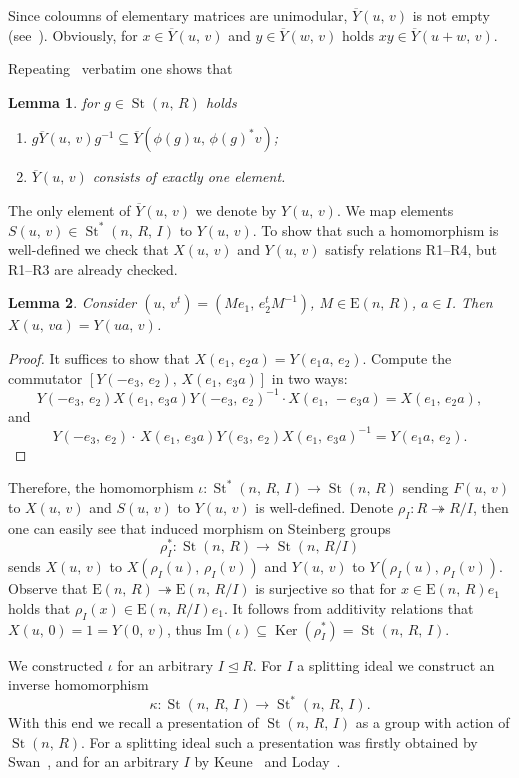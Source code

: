\documentclass[11pt]{amsart}
\theoremstyle{plain} \declaretheorem[name=Theorem, Refname={Theorem,Theorems}]{tm} \Crefname{tm}{Theorem}{Theorems}
\numberwithin{equation}{section}
\newtheorem{lm}{Lemma} \numberwithin{lm}{section} \Crefname{lm}{Lemma}{Lemmas}
\theoremstyle{definition} \newtheorem{df}[lm]{Definition} \Crefname{df}{Definition}{Definitions}
\theoremstyle{remark} \newtheorem{rk}[lm]{Remark} \Crefname{rk}{Remark}{Remarks}
\newcommand{\Ker}{\mathop{\mathrm{Ker}}\nolimits}
\newcommand{\E}{{\mathrm{E}}}
\newcommand{\St}{\mathop{\mathrm{St}}\nolimits}
\newcommand{\epi}{\twoheadrightarrow}
\newcommand{\inv}{^{-1}}
\begin{document}
Since coloumns of elementary matrices are unimodular, $\overline Y(u,\,v)$ is not empty (see~\cite[3.1--3.2]{vdK}). Obviously, for $x\in\overline Y(u,\,v)$ and $y\in\overline Y(w,\,v)$ holds $xy\in\overline Y(u+w,\,v)$.

Repeating~\cite[3.14--3.15]{vdK} verbatim one shows that

\begin{lm}
for $g\in\St(n,\,R)$ holds
\begin{enumerate}
\item
$g\overline Y(u,\,v)g\inv\subseteq\overline Y(\phi(g)u,\,\phi(g)^*v)$;
\item
$\overline Y(u,\,v)$ consists of exactly one element.
\end{enumerate}
\end{lm}

The only element of $\overline Y(u,\,v)$ we denote by $Y(u,\,v)$. We map elements $S(u,\,v)\in\St^*(n,\,R,\,I)$ to $Y(u,\,v)$. To show that such a homomorphism is well-defined we check that $X(u,\,v)$ and $Y(u,\,v)$ satisfy relations R1--R4, but R1--R3 are already checked.

\begin{lm}
Consider $(u,\,v^t)=(Me_1,\,e_2^tM\inv)$, $M\in\E(n,\,R)$, $a\in I$. Then $X(u,\,va)=Y(ua,\,v)$.
\end{lm}

\begin{proof}
It suffices to show that $X(e_1,\,e_2a)=Y(e_1a,\,e_2)$. Compute the commutator $[Y(-e_3,\,e_2),\,X(e_1,\,e_3a)]$ in two ways:
$$
Y(-e_3,\,e_2)X(e_1,\,e_3a)Y(-e_3,\,e_2)\inv\cdot X(e_1,\,-e_3a)=X(e_1,\,e_2a),
$$
and
$$
Y(-e_3,\,e_2)\cdot\,X(e_1,\,e_3a)Y(e_3,\,e_2)X(e_1,\,e_3a)\inv=Y(e_1a,\,e_2).
$$
\end{proof}

Therefore, the homomorphism $\iota\colon\St^*(n,\,R,\,I)\rightarrow\St(n,\,R)$ sending $F(u,\,v)$ to $X(u,\,v)$ and $S(u,\,v)$ to $Y(u,\,v)$ is well-defined. Denote $\rho_I\colon R\epi R/I$, then one can easily see that induced morphism on Steinberg groups 
$$\rho_I^*\colon\St(n,\,R)\rightarrow\St(n,\,R/I)$$
 sends $X(u,\,v)$ to $X(\rho_I(u),\,\rho_I(v))$ and $Y(u,\,v)$ to $Y(\rho_I(u),\,\rho_I(v))$. Observe that $\E(n,\,R)\epi\E(n,\,R/I)$ is surjective so that for $x\in\E(n,\,R)e_1$ holds that $\rho_I(x)\in\E(n,\,R/I)e_1$. It follows from additivity relations that $X(u,\,0)=1=Y(0,\,v)$, thus $\mathrm{Im}(\iota)\subseteq\Ker(\rho_I^*)=\St(n,\,R,\,I)$.

We constructed $\iota$ for an arbitrary $I\trianglelefteq R$. For $I$ a splitting ideal we construct an inverse homomorphism
$$
\kappa\colon\St(n,\,R,\,I)\rightarrow\St^*(n,\,R,\,I).
$$
With this end we recall a presentation of $\St(n,\,R,\,I)$ as a group with action of $\St(n,\,R)$. For a splitting ideal such a presentation was firstly obtained by Swan~\cite{Swa1,Swa2,Swa3}, and for an arbitrary $I$ by Keune~\cite{Keu} and Loday~\cite{Lod}.
\end{document}
